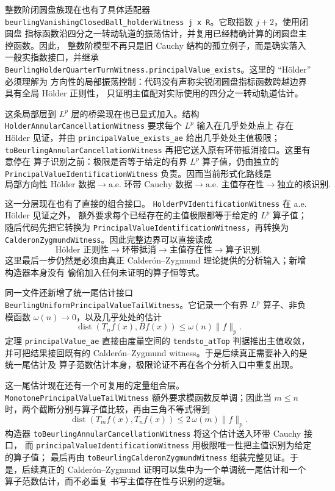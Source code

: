 \documentclass[UTF8,fontset=none,a4paper,11pt]{ctexart}
\begin{document}
整数阶闭圆盘族现在也有了具体适配器
\texttt{beurlingVanishingClosedBall\_holderWitness j x R}。它取指数 \(j+2\)，使用闭圆盘
指标函数沿四分之一转动轨道的振荡估计，并复用已经精确计算的闭圆盘主控函数。因此，
整数阶模型不再只是旧 Cauchy 结构的孤立例子，而是确实落入一般实指数接口，并继承
\texttt{BeurlingHolderQuarterTurnWitness.principalValue\_exists}。这里的 ``Hölder'' 必须理解为
方向性的局部振荡控制：代码没有声称尖锐闭圆盘指标函数跨越边界具有全局 Hölder 正则性，
只证明主值配对实际使用的四分之一转动轨道估计。\par

这条局部层到 \(L^p\) 层的桥梁现在也已显式加入。结构
\texttt{HolderAnnularCancellationWitness} 要求每个 \(L^p\) 输入在几乎处处点上
存在 Hölder 见证，并由 \texttt{principalValue\_exists\_ae} 给出几乎处处主值极限；
\texttt{toBeurlingAnnularCancellationWitness} 再把它送入原有环带抵消接口。这里有意停在
算子识别之前：极限是否等于给定的有界 \(L^p\) 算子值，仍由独立的
\texttt{PrincipalValueIdentificationWitness} 负责。因而当前形式化路线是
\[
 \text{局部方向性 Hölder 数据}
 \longrightarrow \text{a.e. 环带 Cauchy 数据}
 \longrightarrow \text{a.e. 主值存在性}
 \longrightarrow \text{独立的核识别}.
\]
\par

这一分层现在也有了直接的组合接口。
\texttt{HolderPVIdentificationWitness} 在 a.e. Hölder 见证之外，
额外要求每个已经存在的主值极限都等于给定的 \(L^p\) 算子值；随后代码先把它转换为
\texttt{PrincipalValueIdentificationWitness}，再转换为
\texttt{CalderonZygmundWitness}。因此完整边界可以直接读成
\[
 \text{Hölder 正则性}
 \longrightarrow \text{环带抵消}
 \longrightarrow \text{主值存在性}
 \longrightarrow \text{算子识别}.
\]
这里最后一步仍然是必须由真正 Calderón--Zygmund 理论提供的分析输入；新增构造器本身没有
偷偷加入任何未证明的算子恒等式。\par

同一文件还新增了统一尾估计接口
\texttt{BeurlingUniformPrincipalValueTailWitness}。它记录一个有界 \(L^p\) 算子、非负模函数
\(\omega(n)\to0\)，以及几乎处处的估计
\[
 \operatorname{dist}(T_n f(x),Bf(x))\le \omega(n)\lVert f\rVert_p.
\]
定理 \texttt{principalValue\_ae} 直接由度量空间的 \texttt{tendsto\_atTop} 判据推出主值收敛，
并可把结果接回既有的 Calderón--Zygmund witness。于是后续真正需要补入的是统一尾估计及
算子范数估计本身，极限论证不再在各个分析入口中重复出现。\par

这一尾估计现在还有一个可复用的定量组合层。
\texttt{MonotonePrincipalValueTailWitness} 额外要求模函数反单调；因此当
\(m\le n\) 时，两个截断分别与算子值比较，再由三角不等式得到
\[
 \operatorname{dist}(T_m f(x),T_n f(x))
 \le 2\,\omega(m)\lVert f\rVert_p.
\]
构造器 \texttt{toBeurlingAnnularCancellationWitness} 将这个估计送入环带 Cauchy 接口，
而 \texttt{principalValueIdentificationWitness} 用极限唯一性把主值识别为给定的算子值；
最后再由 \texttt{toBeurlingCalderonZygmundWitness} 组装完整见证。于是，后续真正的
Calderón--Zygmund 证明可以集中为一个单调统一尾估计和一个算子范数估计，而不必重复
书写主值存在性与识别的逻辑。\par
\end{document}

